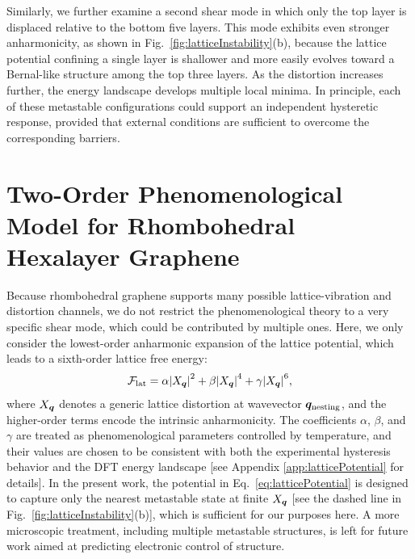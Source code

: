 \documentclass[aps,prx,article,twocolumn,amsmath,amssymb,superscriptaddress,longbibliography]{revtex4-2}
\begin{document}
Similarly, we further examine a second shear mode in which only the top layer is displaced relative to the bottom five layers. This mode exhibits even stronger anharmonicity, as shown in Fig.~\ref{fig:latticeInstability}(b), because the lattice potential confining a single layer is shallower and more easily evolves toward a Bernal-like structure among the top three layers. As the distortion increases further, the energy landscape develops multiple local minima. In principle, each of these metastable configurations could support an independent hysteretic response, provided that external conditions are sufficient to overcome the corresponding barriers.




\section{Two-Order Phenomenological Model for Rhombohedral Hexalayer Graphene}

Because rhombohedral graphene supports many possible lattice-vibration and distortion channels, we do not restrict the phenomenological theory to a very specific shear mode, which could be contributed by multiple ones. Here, we only consider the lowest-order anharmonic expansion of the lattice potential, which leads to a sixth-order lattice free energy:
\begin{align}\label{eq:latticePotential}
\mathcal{F}_{\rm lat} =
\alpha \abs{X_{\vb*{q}}}^2 + \beta \abs{X_{\vb*{q}}}^4 + \gamma \abs{X_{\vb*{q}}}^6 ,
\end{align}
where $X_{\vb*{q}}$ denotes a generic lattice distortion at wavevector $\vb*{q}_{\rm nesting}$, and the higher-order terms encode the intrinsic anharmonicity. The coefficients $\alpha$, $\beta$, and $\gamma$ are treated as phenomenological parameters controlled by temperature, and their values are chosen to be consistent with both the experimental hysteresis behavior and the DFT energy landscape [see Appendix \ref{app:latticePotential} for details]. In the present work, the potential in Eq.~\eqref{eq:latticePotential} is designed to capture only the nearest metastable state at finite $X_{\vb*{q}}$ [see the dashed line in Fig.~\ref{fig:latticeInstability}(b)], which is sufficient for our purposes here. A more microscopic treatment, including multiple metastable structures, is left for future work aimed at predicting electronic control of structure.
\end{document}
